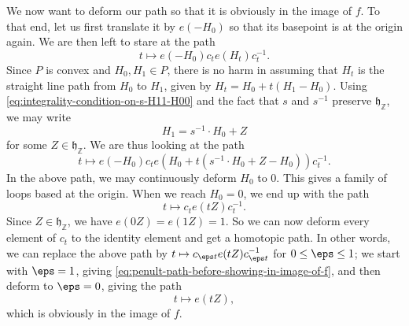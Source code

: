 \documentclass[reqno]{amsart} 
\begin{document}
We now want to deform our path so that it is obviously in the image of $f$.  To that end, let us first translate it by $e(-H_0)$ so that its basepoint is at the origin again.  We are then left to stare at the path
\begin{equation*}
  t \mapsto e(-H_0) c_t e(H_t) c_t^{-1}.
\end{equation*}
Since $P$ is convex and $H_0,H_1 \in P$, there is no harm in assuming that $H_t$ is the straight line path from $H_0$ to $H_1$, given by $H_t = H_0 + t(H_1 - H_0)$.  Using \eqref{eq:integrality-condition-on-s-H11-H00} and the fact that $s$ and $s^{-1}$ preserve $\mathfrak{h}_\mathbb{Z}$, we may write
\begin{equation*}
  H_1 = s^{-1} \cdot H_0 + Z
\end{equation*}
for some $Z \in \mathfrak{h}_\mathbb{Z}$.  We are thus looking at the path
\begin{equation*}
  t \mapsto e(-H_0) c_t e(H_0 + t (s^{-1} \cdot H_0 + Z - H_0) ) c_t^{-1}.
\end{equation*}
In the above path, we may continuously deform $H_0$ to $0$.  This gives a family of loops based at the origin.  When we reach $H_0 = 0$, we end up with the path
\begin{equation}\label{eq:penult-path-before-showing-in-image-of-f}
  t \mapsto
  c_t e(t  Z ) c_t^{-1}.
\end{equation}
Since $Z \in \mathfrak{h}_\mathbb{Z}$, we have $e(0 Z) = e(1 Z) = 1$.  So we can now deform every element of $c_t$ to the identity element and get a homotopic path.  In other words, we can replace the above path by $t \mapsto c_{\eps t} e(t Z) c_{\eps t}^{-1}$ for $0 \leq \eps \leq 1$; we start with $\eps = 1$, giving \eqref{eq:penult-path-before-showing-in-image-of-f}, and then deform to $\eps = 0$, giving the path
\begin{equation*}
  t \mapsto e(t Z),
\end{equation*}
which is obviously in the image of $f$.
\end{document}
